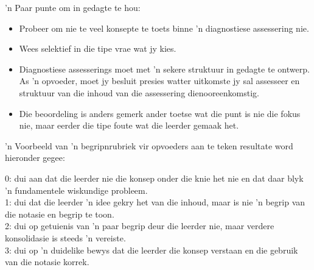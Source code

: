 'n Paar punte om in gedagte te hou:
\begin{itemize}[noitemsep]
\item
  Probeer om nie te veel konsepte te toets binne 'n diagnostiese assessering nie.
\item
  Wees selektief in die tipe vrae wat jy kies.
\item
  Diagnostiese assesserings moet met 'n sekere struktuur in gedagte te ontwerp. As 'n opvoeder, moet jy besluit presies watter uitkomste jy sal assesseer en struktuur van die inhoud van die assessering dienooreenkomstig.
\item
  Die beoordeling is anders gemerk ander toetse wat die punt is nie die fokus nie, maar eerder die tipe foute wat die leerder gemaak het.
\end{itemize}
'n Voorbeeld van 'n begripnrubriek vir opvoeders aan te teken resultate word hieronder gegee:

0: dui aan dat die leerder nie die konsep onder die knie het nie en dat daar blyk 'n fundamentele wiskundige probleem.\\
1: dui dat die leerder 'n idee gekry het van die inhoud, maar is nie 'n begrip van die notasie en begrip te toon.\\
2: dui op getuienis van 'n paar begrip deur die leerder nie, maar verdere konsolidasie is steeds 'n vereiste.\\
3: dui op 'n duidelike bewys dat die leerder die konsep verstaan ​​en die gebruik van die notasie korrek.

